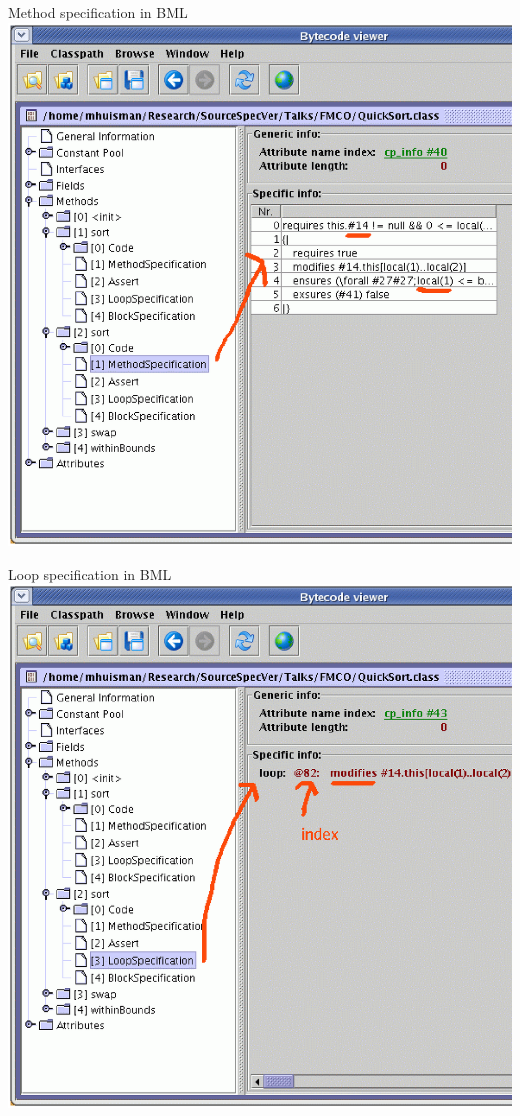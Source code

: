 \documentclass[final,nocolorBG,a4,mobius,nototal,pdf,slideColor]{prosper}
\begin{document}
\begin{slide}{Method specification in BML}
\vspace*{-1.5em}
\includegraphics[height=\textheight]{screen11.ps}
\end{slide}

\begin{slide}{Loop specification in BML}
\vspace*{-1.5em}
\includegraphics[height=\textheight]{screen12.ps}
\end{slide}
\end{document}
